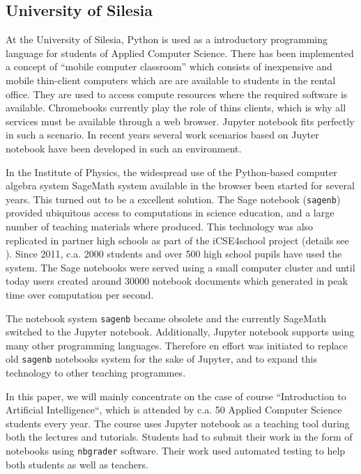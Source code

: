 \documentclass[twocolumn]{svjour3}          %
\begin{document}
\subsection{University of Silesia}


At the University of Silesia, Python is used as a introductory
programming language for students of Applied Computer Science. There
has been implemented a concept of ``mobile computer classroom'' which
consists of inexpensive and mobile thin-client computers which are are
available to students in the rental office. They are used to access
compute resources where the required software is available.
Chromebooks currently play the role of thins clients, which is why all
services must be available through a web browser.  Jupyter notebook
fits perfectly in such a scenario. In recent years several work
scenarios based on Juyter notebook have been developed in such an
environment.

In the Institute of Physics, the widespread use of the Python-based
computer algebra system SageMath\cite{sagemath} system available in
the browser been started for several years. This turned out to be a
excellent solution. The Sage notebook (\texttt{sagenb}) provided
ubiquitous access to computations in science education, and a large
number of teaching materials where produced. This technology was also
replicated in partner high schools as part of the iCSE4school project
(details see \cite{icse4school}). Since 2011, c.a. 2000 students and
over 500 high school pupils have used the system. The Sage notebooks
were served using a small computer cluster and until today users
created around 30000 notebook documents which generated in peak time
over computation per second.

The notebook system \texttt{sagenb} became obsolete and the currently
SageMath switched to the Jupyter notebook. Additionally, Jupyter
notebook supports using many other programming languages. Therefore en
effort was initiated to replace old \texttt{sagenb} notebooks system
for the sake of Jupyter, and to expand this technology to other
teaching programmes.


In this paper, we will mainly concentrate on the case of course
``Introduction to Artificial Intelligence``, which is attended by
c.a. 50 Applied Computer Science students every year. The course uses
Jupyter notebook as a teaching tool during both the lectures and
tutorials. Students had to submit their work in the form of notebooks
using \texttt{nbgrader} software. Their work used automated testing to
help both students as well as teachers.
\end{document}
